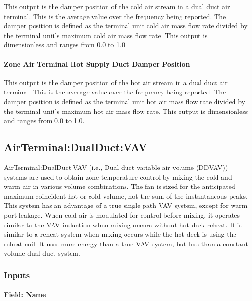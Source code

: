 This output is the damper position of the cold air stream in a dual duct air terminal. This is the average value over the frequency being reported. The damper position is defined as the terminal unit cold air mass flow rate divided by the terminal unit's maximum cold air mass flow rate. This output is dimensionless and ranges from 0.0 to 1.0.

\paragraph{Zone Air Terminal Hot Supply Duct Damper Position}\label{zone-air-terminal-hot-supply-duct-damper-position}

This output is the damper position of the hot air stream in a dual duct air terminal. This is the average value over the frequency being reported. The damper position is defined as the terminal unit hot air mass flow rate divided by the terminal unit's maximum hot air mass flow rate. This output is dimensionless and ranges from 0.0 to 1.0.

\subsection{AirTerminal:DualDuct:VAV}\label{airterminaldualductvav}

AirTerminal:DualDuct:VAV (i.e., Dual duct variable air volume (DDVAV)) systems are used to obtain zone temperature control by mixing the cold and warm air in various volume combinations. The fan is sized for the anticipated maximum coincident hot or cold volume, not the sum of the instantaneous peaks. This system has an advantage of a true single path VAV system, except for warm port leakage. When cold air is modulated for control before mixing, it operates similar to the VAV induction when mixing occurs without hot deck reheat. It is similar to a reheat system when mixing occurs while the hot deck is using the reheat coil. It uses more energy than a true VAV system, but less than a constant volume dual duct system.

\subsubsection{Inputs}\label{inputs-15-000}

\paragraph{Field: Name}\label{field-name-15}

